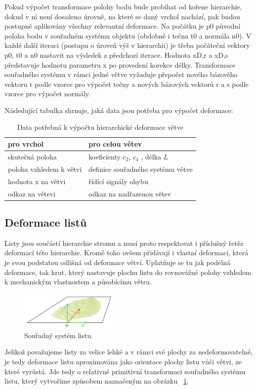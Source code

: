 Pokud výpočet transformace polohy bodu bude probíhat od kořene hierarchie, dokud v ní není dosaženo úrovně, na které se daný vrchol nachází, pak budou postupně aplikovány všechny relevantní deformace. Na počátku je p0 původní poloha bodu v souřadném systému objektu (obdobně i tečna t0  a normála n0). V každé další iteraci (postupu o úroveň výš v hierarchii) je třeba počáteční vektory p0, t0 a n0 nastavit na výsledek z předchozí iterace. Hodnota xD,r a xD,s představuje hodnotu parametru x po provedení korekce délky.  Transformace souřadného systému v rámci jedné větve vyžaduje přepočet nového bázového vektoru t podle vzorce pro výpočet tečny a nových bázových vektorů r a s podle vzorce pro výpočet normály. 

Následující tabulka shrnuje, jaká data jsou potřeba pro výpočet deformace:
\newline
\begin{table}
\centering
\begin{tabular}{| l | l | }
  \hline                       
  pro vrchol & pro celou větev  \\
\hline   
  skutečná poloha & koeficienty $c_2$,  $c_4$ , délka  $L$  \\
  poloha vzhledem k větvi & definice souřadného systému větve \\
hodnota x na větvi & řídící signály ohybu \\
odkaz na větevi & odkaz na nadřazenou větev \\
  \hline  
\end{tabular}
\caption{Data potřebná k výpočtu hierarchické deformace větve}
\end{table}


\subsection{Deformace listů}
Listy jsou součástí hierarchie stromu a musí proto respektovat i příslušný řetěz deformací této hierarchie. Kromě toho ovšem přidávají i vlastní deformaci, která je svou podstatou odlišná od deformace větví. Uplatňuje se tu jak podélná deformace, tak krut, který nastavuje plochu listu do rovnovážné polohy vzhledem k mechanickým vlastnostem a působícímu větru. 
\begin{figure}[here]
\begin{center}
\includegraphics[width=0.45\textwidth]{./figures/leafCoordSystem2.png}
\end{center}
\caption[Souřadný systém listu]%
{ Souřadný systém listu.
\label{fig:bendLeaf}
}

\end{figure}
Jelikož považujeme listy za velice lehké a v rámci své plochy za nedeformovatelné, je tedy deformace listu aproximována jako orientace plochy listu vůči větvi, ze které vyrůstá. Jde tedy o relativně primitivní transformaci souřadného systému listu, který vytvoříme způsobem naznačeným na obrázku ~\ref{fig:bendLeaf}.


